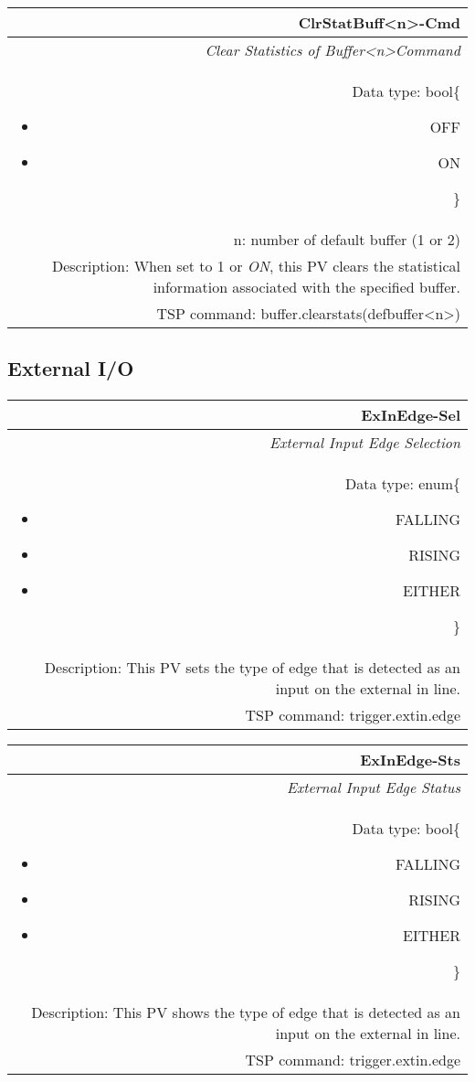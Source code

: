 \documentclass[openany]{article}
\begin{document}
		\begin{tabular}{N}
			\hline
			\bfseries ClrStatBuff\textless n\textgreater-Cmd\label{pv:clrstatbuff-cmd} \\ \hline
			\emph{Clear Statistics of Buffer\textless n\textgreater Command} \\
			Data type: bool\{\begin{itemize}[noitemsep]
				\small
				\item[] OFF
				\item[] ON
			\end{itemize}\} \\
			n: number of default buffer (1 or 2) \\
			Description: When set to 1 or \emph{ON}, this PV clears the statistical information associated with the specified buffer. \\
			TSP command: buffer.clearstats(defbuffer\textless n\textgreater)
		\end{tabular}

	\subsection{External I/O}\label{pvgroup:external-io}

		\paragraph{} %

		\begin{tabular}{N}
			\hline
			\bfseries ExInEdge-Sel\label{pv:exinedge-sel} \\ \hline
			\emph{External Input Edge Selection} \\
			Data type: enum\{\begin{itemize}[noitemsep]
				\small
				\item[] FALLING
				\item[] RISING
				\item[] EITHER
			\end{itemize}\} \\
			Description: This PV sets the type of edge that is detected as an input on the external in line. \\
			TSP command: trigger.extin.edge
		\end{tabular}

		\begin{tabular}{N}
			\hline
			\bfseries ExInEdge-Sts\label{pv:exinedge-sts} \\ \hline
			\emph{External Input Edge Status} \\
			Data type: bool\{\begin{itemize}[noitemsep]
				\small
				\item[] FALLING
				\item[] RISING
				\item[] EITHER
			\end{itemize}\} \\
			Description: This PV shows the type of edge that is detected as an input on the external in line. \\
			TSP command: trigger.extin.edge
		\end{tabular}
\end{document}
